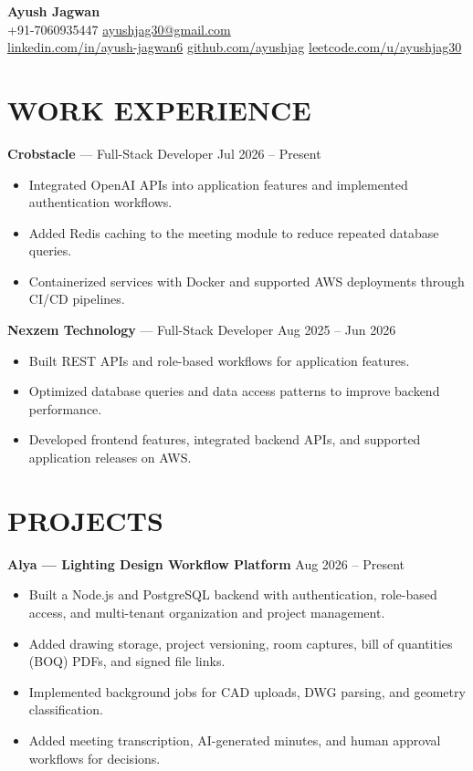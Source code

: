 \documentclass[a4paper,11pt]{article}
\begin{document}
\begin{center}
    {\LARGE\textbf{Ayush Jagwan}}\\[4pt]
    +91-7060935447 \enspace\textbar\enspace
    \href{mailto:ayushjag30@gmail.com}{ayushjag30@gmail.com}\\[3pt]
    {\small
    \href{https://www.linkedin.com/in/ayush-jagwan6/}{linkedin.com/in/ayush-jagwan6}
    \enspace\textbar\enspace
    \href{https://github.com/ayushjag}{github.com/ayushjag}
    \enspace\textbar\enspace
    \href{https://leetcode.com/u/ayushjag30/}{leetcode.com/u/ayushjag30}}
\end{center}

\section*{WORK EXPERIENCE}

\textbf{Crobstacle} --- Full-Stack Developer \hfill Jul 2026 -- Present
\begin{itemize}
    \item Integrated OpenAI APIs into application features and implemented authentication workflows.
    \item Added Redis caching to the meeting module to reduce repeated database queries.
    \item Containerized services with Docker and supported AWS deployments through CI/CD pipelines.
\end{itemize}

\vspace{3pt}
\textbf{Nexzem Technology} --- Full-Stack Developer \hfill Aug 2025 -- Jun 2026
\begin{itemize}
    \item Built REST APIs and role-based workflows for application features.
    \item Optimized database queries and data access patterns to improve backend performance.
    \item Developed frontend features, integrated backend APIs, and supported application releases on AWS.
\end{itemize}

\section*{PROJECTS}

\textbf{Alya --- Lighting Design Workflow Platform} \hfill Aug 2026 -- Present
\begin{itemize}
    \item Built a Node.js and PostgreSQL backend with authentication, role-based access, and multi-tenant organization and project management.
    \item Added drawing storage, project versioning, room captures, bill of quantities (BOQ) PDFs, and signed file links.
    \item Implemented background jobs for CAD uploads, DWG parsing, and geometry classification.
    \item Added meeting transcription, AI-generated minutes, and human approval workflows for decisions.
\end{itemize}
\end{document}
